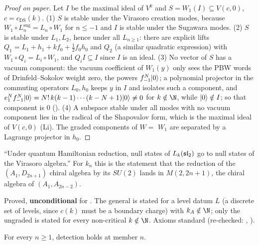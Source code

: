 \begin{proof}[Proof on paper]
Let $I$ be the maximal ideal of $V^k$ and $S=W_1(I)\subseteq V(c,0)$, $c=c_{\mathrm{DS}}(k)$. (1) $S$ is stable under the
Virasoro creation modes, because $W_1\circ L^{\mathrm{sug}}_{n}=L_n\circ W_1$ for $n\le-1$ and $I$ is stable under the
Sugawara modes. (2) $S$ is stable under $L_1,L_2$, hence under all $L_{n\ge1}$: there are explicit lifts
$Q_1=L_1+h_1+kf_0+\frac12f_0h_0$ and $Q_2$ (a similar quadratic expression) with $W_1\circ Q_i=L_i\circ W_1$, and
$Q_iI\subseteq I$ since $I$ is an ideal. (3) No vector of $S$ has a vacuum component: the vacuum coefficient of $W_1(y)$
only sees the PBW words of Drinfeld--Sokolov weight zero, the powers $f_{-1}^N|0\rangle$; a polynomial projector in
the commuting operators $L_0,h_0$ keeps $y$ in $I$ and isolates such a component, and
$e_1^Nf_{-1}^N|0\rangle=N!\,k(k-1)\cdots(k-N+1)|0\rangle\ne0$ for $k\notin\N$, while
$|0\rangle\notin I$; so that component is $0$ (). (4) A subspace stable under all modes with no
vacuum component lies in the radical of the Shapovalov form, which is the maximal ideal of $V(c,0)$ (Li). The graded
components of $W=$  $W_1$ are separated by a Lagrange projector in $h_0$.
\end{proof}

\begin{physics}
``Under quantum Hamiltonian reduction, null states of $L_k(\mathfrak{sl}_2)$ go to null states of the Virasoro algebra.''
For $k_n$ this is the statement that the reduction of the $(A_1,D_{2n+1})$ chiral algebra by its $SU(2)$ lands in
$M(2,2n+1)$, the chiral algebra of $(A_1,A_{2n-2})$.
\end{physics}

\begin{status}
Proved, \textbf{unconditional} for . The general  is stated for a
level datum $L$ (a discrete set of levels, since $c(k)$ must be a boundary charge) with $k_A\notin\N$; only the ungraded
 is stated for every non-critical $k\notin\N$. Axioms standard (re-checked: ,
).
\end{status}

\begin{theorem}\label{l29:thm:detect}
For every $n\ge1$, detection holds at member $n$.
\end{theorem}

